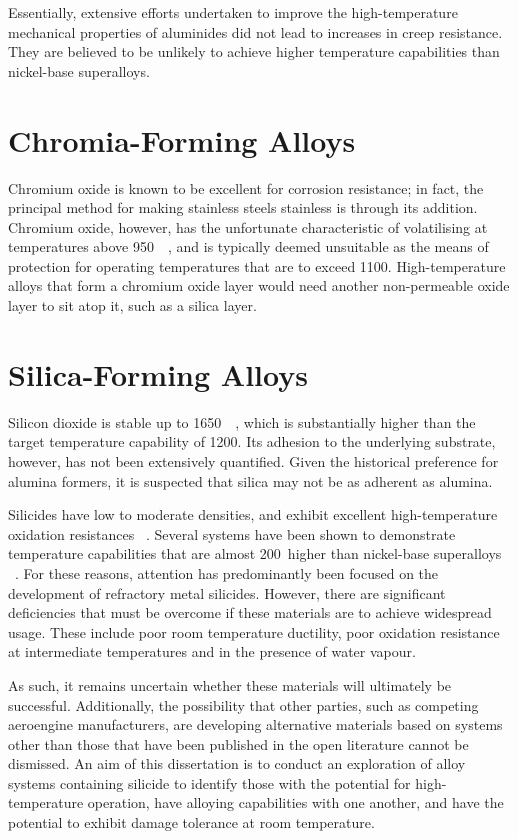 Essentially, extensive efforts undertaken to improve the high-temperature mechanical properties of aluminides did not lead to increases in creep resistance.  They are believed to be unlikely to achieve higher temperature capabilities than nickel-base superalloys.


\section{Chromia-Forming Alloys}

Chromium oxide is known to be excellent for corrosion resistance; in fact, the principal method for making stainless steels stainless is through its addition.  Chromium oxide, however, has the unfortunate characteristic of volatilising at temperatures above 950\celsius\ ~\cite{perez02}, and is typically deemed unsuitable as the means of protection for operating temperatures that are to exceed 1100\celsius.  High-temperature alloys that form a chromium oxide layer would need another non-permeable oxide layer to sit atop it, such as a silica layer.


\section{Silica-Forming Alloys}

Silicon dioxide is stable up to 1650\celsius\ ~\cite{hallstedt92}, which is substantially higher than the target temperature capability of 1200\celsius.  Its adhesion to the underlying substrate, however, has not been extensively quantified.  Given the historical preference for alumina formers, it is suspected that silica may not be as adherent as alumina.  

Silicides have low to moderate densities, and exhibit excellent high-temperature oxidation resistances ~\cite{brady00}.  Several systems have been shown to demonstrate temperature capabilities that are almost 200\celsius\ higher than nickel-base superalloys ~\cite{schneibel03, sadananda99}.  For these reasons, attention has predominantly been focused on the development of refractory metal silicides.  However, there are significant deficiencies that must be overcome if these materials are to achieve widespread usage.  These include poor room temperature ductility, poor oxidation resistance at intermediate temperatures and in the presence of water vapour.  

As such, it remains uncertain whether these materials will ultimately be successful.  Additionally, the possibility that other parties, such as competing aeroengine manufacturers, are developing alternative materials based on systems other than those that have been published in the open literature cannot be dismissed.  An aim of this dissertation is to conduct an exploration of alloy systems containing silicide to identify those with the potential for high-temperature operation, have alloying capabilities with one another, and have the potential to exhibit damage tolerance at room temperature.


